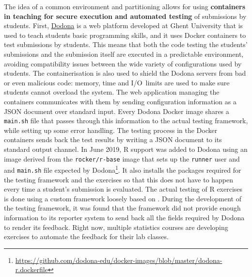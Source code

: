 The idea of a common environment and partitioning allows for using
\textbf{containers in teaching for secure execution and automated
testing} of submissions by students. First,
\href{https://dodona.ugent.be}{Dodona} is a web platform developed at
Ghent University that is used to teach students basic programming
skills, and it uses Docker containers to test submissions by students.
This means that both the code testing the students' submissions and the
submission itself are executed in a predictable environment, avoiding
compatibility issues between the wide variety of configurations used by
students. The containerisation is also used to shield the Dodona servers
from bad or even malicious code: memory, time and I/O~limits are used to
make sure students cannot overload the system. The web application
managing the containers communicates with them by sending configuration
information as a JSON document over standard input. Every Dodona Docker
image shares a \texttt{main.sh} file that passes through this
information to the actual testing framework, while setting up some error
handling. The testing process in the Docker containers sends back the
test results by writing a JSON document to its standard output channel.
In June 2019, R support was added to Dodona using an image derived from
the \texttt{rocker/r-base} image that sets up the \texttt{runner} user
and and \texttt{main.sh} file expected by
Dodona\footnote{\href{https://github.com/dodona-edu/docker-images/blob/master/dodona-r.dockerfile}{https://github.com/dodona-edu/docker-images/blob/master/dodona-r.dockerfile}}.
It also installs the packages required for the testing framework and the
exercises so that this does not have to happen every time a student's
submission is evaluated. The actual testing of R exercises is done using
a custom framework loosely based on 
\citep{wickham_testthat_2011}. During the development of the testing
framework, it was found that the  framework did not
provide enough information to its reporter system to send back all the
fields required by Dodona to render its feedback. Right now, multiple
statistics courses are developing exercises to automate the feedback for
their lab classes.

